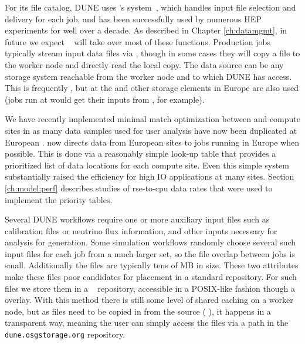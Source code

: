 \documentclass[../main-v1.tex]{subfiles}
\begin{document}
For its file catalog, DUNE uses 's  system~\cite{Illingworth:2014mba}, which handles input file selection and delivery for each job, and has been successfully used by numerous HEP experiments for well over a decade. As described in Chapter \ref{ch:datamgmt},  in future we expect ~\cite{Barisits:2019fyl} will  take over most of these functions. Production jobs typically stream input data files via , though in some cases they will copy a file to the worker node and directly read the local copy. The data source can be any storage system reachable from the worker
node and to which DUNE has access. This is frequently  , but  at the  and other storage elements in Europe are also used (jobs run at  would get their inputs from  , for example). 

We have recently implemented minimal match optimization between  and compute sites in  as many data samples used for user analysis have now been duplicated at European .   now directs data from European sites to jobs running in Europe when possible.  This is done via a reasonably simple look-up table that provides a prioritized list of data locations for each compute site.  Even this simple system substantially raised the efficiency for high IO applications at many sites. Section \ref{ch:model:perf} describes studies of rse-to-cpu data rates that were used to implement the priority tables. 



Several DUNE workflows require one or more auxiliary input files %
such as calibration files or neutrino flux information, and other inputs necessary for analysis for  generation. Some simulation workflows randomly
choose several such input files for each job from a much larger set, so the file overlap between jobs is small. Additionally the files are typically tens of MB in size. These two attributes make these files poor candidates for placement in a standard  repository. For such files we store them in a ~\cite{bib:stashcache} repository,
accessible in a POSIX-like fashion though a  overlay. With this method there is still some level of shared caching on a worker node, but as files need to be copied in from the source ( ), it happens in a transparent way, meaning the user can simply access the files via a  path in the {\tt dune.osgstorage.org} repository.
\end{document}
